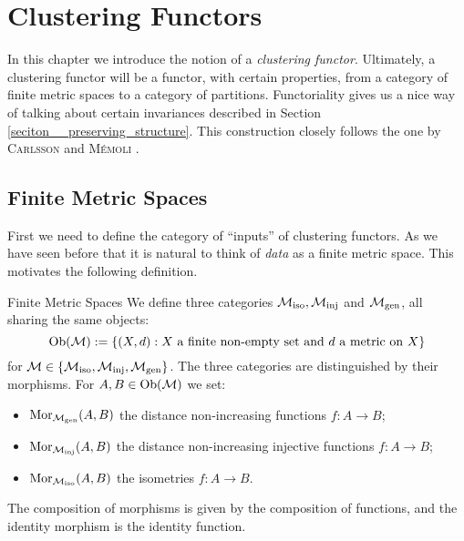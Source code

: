 \chapter{Clustering Functors}
\label{chapter__clustering_functor}

In this chapter we introduce the notion of a \emph{clustering functor}.
Ultimately, a clustering functor will be a functor, with certain properties, from a category of finite metric spaces to a category of partitions. Functoriality gives us a nice way of talking about certain invariances described in Section \ref{seciton__preserving_structure}.
This construction closely follows the one by \textsc{Carlsson} and \textsc{M\'emoli} \cite{Carlsson2010}.

\section{Finite Metric Spaces}
\label{section__finite_metric_spaces}

First we need to define the category of ``inputs'' of clustering functors. As we have seen before that it is natural to think of \emph{data} as a finite metric space. This motivates the following definition.

\begin{definition}{Finite Metric Spaces \cite[Sec.~3.2]{Carlsson2010}}{}
We define three categories ${\mathcal{M}_\mathrm{iso}}, {\mathcal{M}_\mathrm{inj}}$ and ${\mathcal{M}_\mathrm{gen}}$, all sharing the same objects:
\begin{equation*}
\mathrm {Ob}(\mathcal{M}) := \{(X,d): \text{$X$ a finite non-empty set and $d$ a metric on $X$}\}
\end{equation*}
for $\mathcal{M} \in \{{\mathcal{M}_\mathrm{iso}}, {\mathcal{M}_\mathrm{inj}}, {\mathcal{M}_\mathrm{gen}}\}$.
The three categories are distinguished by their morphisms. For $A, B \in \mathrm {Ob}(\mathcal{M})$ we set:
\begin{itemize}
    \item $\mathrm {Mor}_{\mathcal{M}_\mathrm{gen}}(A,B)$ the distance non-increasing functions $f\colon A \to B$;
    \item $\mathrm {Mor}_{\mathcal{M}_\mathrm{inj}}(A,B)$ the distance non-increasing injective functions $f\colon A \to B$;
    \item $\mathrm {Mor}_{\mathcal{M}_\mathrm{iso}}(A,B)$ the isometries $f\colon A \to B$.
\end{itemize}
The composition of morphisms is given by the composition of functions, and the identity morphism is the identity function.
\end{definition}

